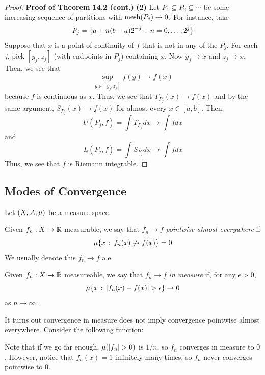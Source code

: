 \begin{proof}{\textbf{Proof of Theorem 14.2 (cont.)}}
    \textbf{(2)} Let $P_1 \subseteq P_2 \subseteq \cdots$ be some increasing sequence of partitions with $\tt{mesh}(P_{j}) \to 0$. For instance, take
    \[ P_{j} = \{a + n(b - a)2^{-j} \col n = 0, \ldots, 2^{j}\} \]
    Suppose that $x$ is a point of continuity of $f$ that is not in any of the $P_{j}$. For each $j$, pick $[y_{j}, z_{j}]$ (with endpoints in $P_{j}$) containing $x$. Now $y_{j} \to x$ and $z_{j} \to x$. Then, we see that
    \[ \sup_{y \in [y_{j}, z_{j}]} f(y) \to f(x) \]
    because $f$ is continuous as $x$. Thus, we see that $T_{P_{j}}(x) \to f(x)$ and by the same argument, $S_{P_{j}}(x) \to f(x)$ for almost every $x \in [a, b]$. Then, 
    \[ U(P_{j}, f) = \int T_{P_{j}} dx \to \int f dx\]
    and
    \[ L(P_{j}, f) = \int S_{P_{j}} dx \to \int f dx \]
    Thus, we see that $f$ is Riemann integrable.

\end{proof}

\subsection*{Modes of Convergence}

Let $(X, \cal{A}, \mu)$ be a measure space. 

\begin{definition}
    Given $f_n : X \to \R$ measurable, we say that $f_n \to f$ \emph{pointwise almost everywhere} if 
    \[ \mu\{x \col f_{n}(x) \not \to f(x)\} = 0 \]
    We usually denote this $f_n \to f$ a.e.
\end{definition}

\begin{definition}
    Given $f_n : X \to \R$ measureable, we say that $f_n \to f$ \emph{in measure} if, for any $\epsilon > 0$, 
    \[ \mu\{x \col \abs{f_{n}(x) - f(x)} > \epsilon\} \to 0 \]
    as $n \to \infty$. 
\end{definition}

It turns out convergence in measure does not imply convergence pointwise almost everywhere. Consider the following function:\\



Note that if we go far enough, $\mu(\abs{f_n} > 0)$ is $1/n$, so $f_n$ converges in measure to $0$. However, notice that $f_n(x) = 1$ infinitely many times, so $f_n$ never converges pointwise to $0$. \\


